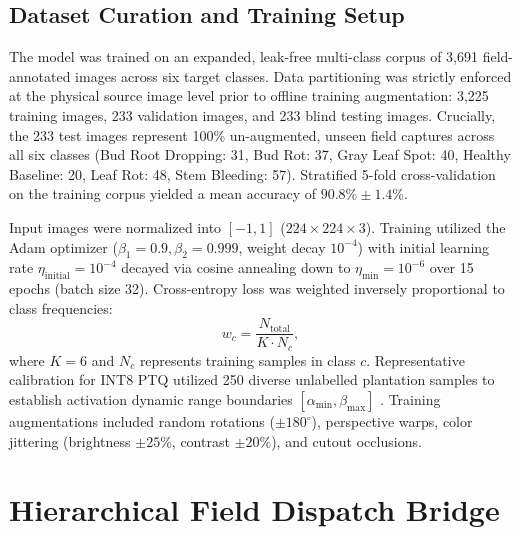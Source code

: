 \documentclass[conference,a4paper]{IEEEtran}
\begin{document}
\subsection{Dataset Curation and Training Setup}
The model was trained on an expanded, leak-free multi-class corpus of 3,691 field-annotated images across six target classes. Data partitioning was strictly enforced at the physical source image level prior to offline training augmentation: 3,225 training images, 233 validation images, and 233 blind testing images. Crucially, the 233 test images represent 100\% un-augmented, unseen field captures across all six classes (Bud Root Dropping: 31, Bud Rot: 37, Gray Leaf Spot: 40, Healthy Baseline: 20, Leaf Rot: 48, Stem Bleeding: 57). Stratified 5-fold cross-validation on the training corpus yielded a mean accuracy of $90.8\% \pm 1.4\%$.

Input images were normalized into $[-1, 1]$ ($224 \times 224 \times 3$). Training utilized the Adam optimizer ($\beta_1=0.9, \beta_2=0.999$, weight decay $10^{-4}$) with initial learning rate $\eta_{\text{initial}} = 10^{-4}$ decayed via cosine annealing down to $\eta_{\min} = 10^{-6}$ over 15 epochs (batch size 32). Cross-entropy loss was weighted inversely proportional to class frequencies:
\begin{equation}
w_c = \frac{N_{\text{total}}}{K \cdot N_c},
\label{eq:class_weights}
\end{equation}
where $K=6$ and $N_c$ represents training samples in class $c$. Representative calibration for INT8 PTQ utilized 250 diverse unlabelled plantation samples to establish activation dynamic range boundaries $[\alpha_{\min}, \beta_{\max}]$ \cite{b22}. Training augmentations included random rotations ($\pm 180^\circ$), perspective warps, color jittering (brightness $\pm 25\%$, contrast $\pm 20\%$), and cutout occlusions.

\section{Hierarchical Field Dispatch Bridge}
\end{document}
